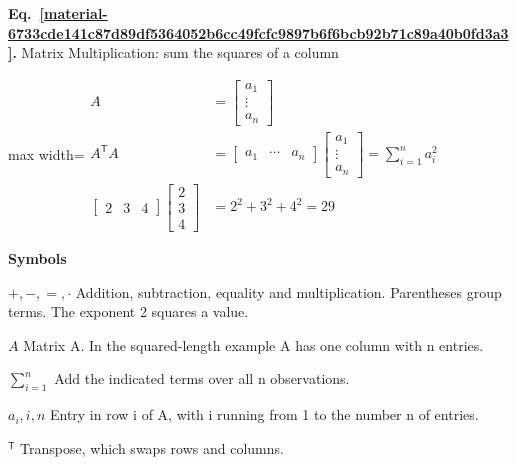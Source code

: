 \documentclass[11pt,a4paper]{article}
\begin{document}
\par\medskip
\noindent\begin{minipage}{\linewidth}
\label{material-6733cde141c87d89df5364052b6cc49fcfc9897b6f6bcb92b71c89a40b0fd3a3}
\noindent\textbf{Eq.~\ref*{material-6733cde141c87d89df5364052b6cc49fcfc9897b6f6bcb92b71c89a40b0fd3a3}.} Matrix Multiplication: sum the squares of a column\par\nopagebreak
\begin{center}\begin{adjustbox}{max width=\linewidth}$\displaystyle \begin{aligned}A&=\begin{bmatrix}a_1\\ \vdots\\ a_n\end{bmatrix}\\[.45em]A^{\mathsf T}A&=\begin{bmatrix}a_1&\cdots&a_n\end{bmatrix}\begin{bmatrix}a_1\\ \vdots\\ a_n\end{bmatrix}=\sum_{i=1}^{n}a_i^2\\[.45em]\begin{bmatrix}2&3&4\end{bmatrix}\begin{bmatrix}2\\3\\4\end{bmatrix}&=2^2+3^2+4^2=29\end{aligned}$\end{adjustbox}\end{center}

\par\noindent\textbf{Symbols}

\par\noindent\textbf{\(+,-,=,\cdot\)} Addition, subtraction, equality and multiplication. Parentheses group terms. The exponent 2 squares a value.

\par\noindent\textbf{\(A\)} Matrix A. In the squared-length example A has one column with n entries.

\par\noindent\textbf{\(\sum_{i=1}^{n}\)} Add the indicated terms over all n observations.

\par\noindent\textbf{\(a_i,i,n\)} Entry in row i of A, with i running from 1 to the number n of entries.

\par\noindent\textbf{\({}^{\mathsf T}\)} Transpose, which swaps rows and columns.

\end{minipage}\par
\medskip
\end{document}
